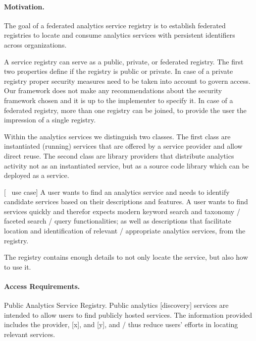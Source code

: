 \documentclass[12pt]{article}
\begin{document}

\paragraph{Motivation.} 
The goal of a federated analytics service registry is to establish federated registries to locate and consume analytics services with persistent identifiers across organizations. 

A service registry can serve as a public, private, or federated registry. The first two properties define if the registry is public or private. In case of a private registry proper security measures need to be taken into account to govern access. Our framework does not make any recommendations about the security framework chosen and it is up to the implementer to specify it. In case of a federated registry, more than one registry can be joined, to provide the user the impression of a single registry.

Within the analytics services we distinguish two classes. The first class are instantiated (running) services that are offered by a service provider and allow direct reuse. The second class are library providers that distribute analytics activity not as an instantiated service, but as a source code library which can be deployed as a service. 


[~ use case] A user wants to find an analytics service and needs to identify candidate services based on their descriptions and features. A user wants to find services quickly and therefor expects modern keyword search and taxonomy / faceted search / query functionalities; as well as descriptions that facilitate location and identification of relevant /  appropriate analytics services, from the registry.

The registry contains enough details to not only locate the service, but also how to use it.

\paragraph{Access Requirements.} Public Analytics Service Registry. Public analytics [discovery] services are intended to allow users to find publicly hosted services. The information provided includes the provider, [x], and [y], and / thus reduce users' efforts in locating relevant services.
\end{document}
